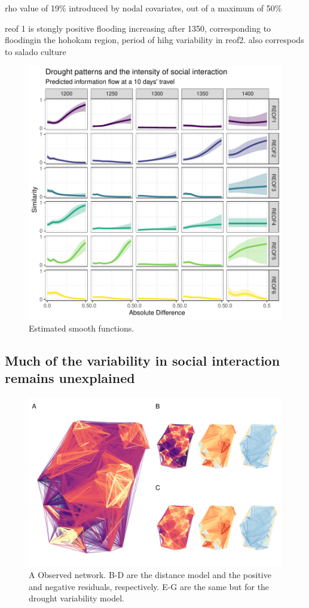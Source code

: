 \documentclass[11pt]{wlscirep}
\begin{document}
rho value of 19\% introduced by nodal covariates, out of a maximum of 50\%

reof 1 is stongly positive flooding increasing after 1350, corresponding to floodingin the hohokam region, period of hihg variability in reof2. also correspods to salado culture

\begin{figure}[!htbp]
\centering
\includegraphics[width=.9\linewidth]{figures/smooths.pdf}
\caption{Estimated smooth functions.}
\label{fig:smooths}
\end{figure}



\subsection*{Much of the variability in social interaction remains unexplained}

\begin{figure}[!htbp]
\centering
\includegraphics[width=.8\linewidth]{figures/residuals.png}
\caption{A Observed network. B-D are the distance model and the positive and negative residuals, respectively. E-G are the same but for the drought variability model.}
\label{fig:residuals}
\end{figure}
\end{document}
